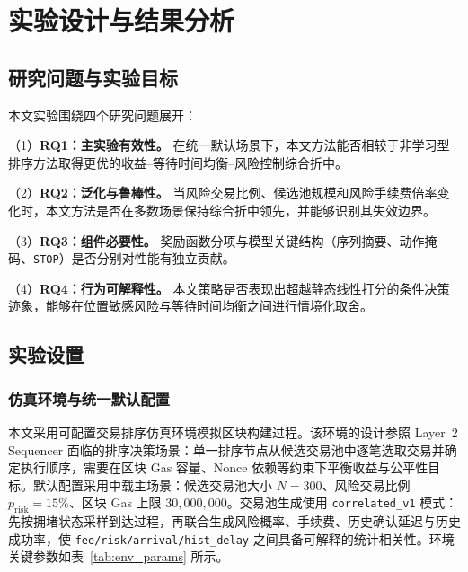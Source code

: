 
\section{实验设计与结果分析}

\subsection{研究问题与实验目标}

本文实验围绕四个研究问题展开：

（1）\textbf{RQ1：主实验有效性。} 在统一默认场景下，本文方法能否相较于非学习型排序方法取得更优的收益--等待时间均衡--风险控制综合折中。

（2）\textbf{RQ2：泛化与鲁棒性。} 当风险交易比例、候选池规模和风险手续费倍率变化时，本文方法是否在多数场景保持综合折中领先，并能够识别其失效边界。

（3）\textbf{RQ3：组件必要性。} 奖励函数分项与模型关键结构（序列摘要、动作掩码、\texttt{STOP}）是否分别对性能有独立贡献。

（4）\textbf{RQ4：行为可解释性。} 本文策略是否表现出超越静态线性打分的条件决策迹象，能够在位置敏感风险与等待时间均衡之间进行情境化取舍。

\subsection{实验设置}

\subsubsection{仿真环境与统一默认配置}

本文采用可配置交易排序仿真环境模拟区块构建过程。该环境的设计参照 Layer~2 Sequencer 面临的排序决策场景：单一排序节点从候选交易池中逐笔选取交易并确定执行顺序，需要在区块 Gas 容量、Nonce 依赖等约束下平衡收益与公平性目标。默认配置采用中载主场景：候选交易池大小 $N{=}300$、风险交易比例 $p_{\text{risk}}{=}15\%$、区块 Gas 上限 $30{,}000{,}000$。交易池生成使用 \texttt{correlated\_v1} 模式：先按拥堵状态采样到达过程，再联合生成风险概率、手续费、历史确认延迟与历史成功率，使 \texttt{fee/risk/arrival/hist\_delay} 之间具备可解释的统计相关性。环境关键参数如表~\ref{tab:env_params} 所示。

